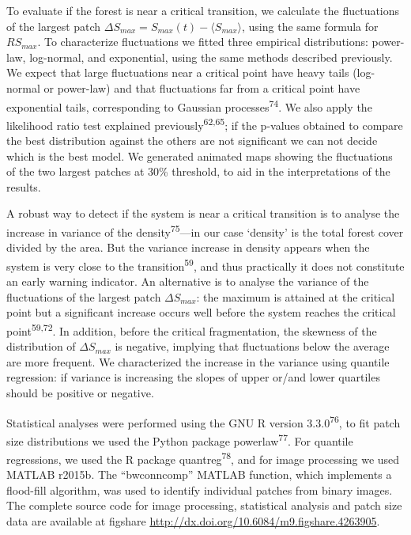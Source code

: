 \documentclass[]{article}
\begin{document}
To evaluate if the forest is near a critical transition, we calculate
the fluctuations of the largest patch
\(\Delta S_{max}=S_{max}(t)-\langle S_{max} \rangle\), using the same
formula for \(RS_{max}\). To characterize fluctuations we fitted three
empirical distributions: power-law, log-normal, and exponential, using
the same methods described previously. We expect that large fluctuations
near a critical point have heavy tails (log-normal or power-law) and
that fluctuations far from a critical point have exponential tails,
corresponding to Gaussian processes\textsuperscript{74}. We also apply
the likelihood ratio test explained previously\textsuperscript{62,65};
if the p-values obtained to compare the best distribution against the
others are not significant we can not decide which is the best model. We
generated animated maps showing the fluctuations of the two largest
patches at 30\% threshold, to aid in the interpretations of the results.

A robust way to detect if the system is near a critical transition is to
analyse the increase in variance of the density\textsuperscript{75}---in
our case `density' is the total forest cover divided by the area. But
the variance increase in density appears when the system is very close
to the transition\textsuperscript{59}, and thus practically it does not
constitute an early warning indicator. An alternative is to analyse the
variance of the fluctuations of the largest patch \(\Delta S_{max}\):
the maximum is attained at the critical point but a significant increase
occurs well before the system reaches the critical
point\textsuperscript{59,72}. In addition, before the critical
fragmentation, the skewness of the distribution of \(\Delta S_{max}\) is
negative, implying that fluctuations below the average are more
frequent. We characterized the increase in the variance using quantile
regression: if variance is increasing the slopes of upper or/and lower
quartiles should be positive or negative.

Statistical analyses were performed using the GNU R version
3.3.0\textsuperscript{76}, to fit patch size distributions we used the
Python package powerlaw\textsuperscript{77}. For quantile regressions,
we used the R package quantreg\textsuperscript{78}, and for image
processing we used MATLAB r2015b. The ``bwconncomp'' MATLAB function,
which implements a flood-fill algorithm, was used to identify individual
patches from binary images. The complete source code for image
processing, statistical analysis and patch size data are available at
figshare \url{http://dx.doi.org/10.6084/m9.figshare.4263905}.
\end{document}
